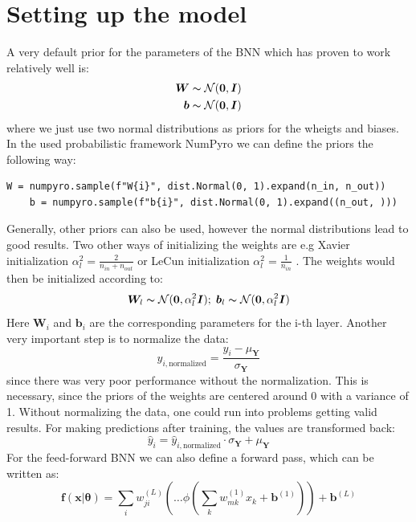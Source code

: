 \documentclass{article}
\newcommand{\Norm}{\mathcal{N}}
\begin{document}
\section{Setting up the model}
A very default prior for the parameters of the BNN which has proven to work relatively well \cite{BNNTut} is:
\begin{align}
    \bm W \thicksim \mathcal{N}(\bm 0,\bm I)\\
    \bm b \thicksim \mathcal{N}(\bm 0, \bm I)
\end{align}
where we just use two normal distributions as priors for the wheigts and biases. In the used probabilistic framework NumPyro we can define the priors the following way:
\begin{lstlisting}[caption= {Setting up priors for wheits},captionpos=t]
    W = numpyro.sample(f"W{i}", dist.Normal(0, 1).expand(n_in, n_out))
    b = numpyro.sample(f"b{i}", dist.Normal(0, 1).expand((n_out, )))
\end{lstlisting}
Generally, other priors can also be used, however the normal distributions lead to good results. Two  other ways of initializing the weights are e.g Xavier initialization $\alpha_l^2 = \tfrac{2}{n_{in}+n_{out}}$ or LeCun initialization $\alpha_l^2 = \tfrac{1}{n_{in}}$ \cite{murphy}. The weights would then be initialized according to:
\begin{equation}
    \bm W_l \thicksim \Norm(\bm 0, \alpha_l^2 \bm I); \; \bm b_l \thicksim \Norm(\bm 0, \alpha_l^2 \bm I)
\end{equation}
Here $\bm W_i$ and $\bm b_i$ are the corresponding parameters for the i-th layer. Another very important step is to normalize the data:
\begin{equation}
     y_{i, \text{normalized}} = \frac{ y_i - \mu_{\bm Y}}{\sigma_{\bm Y}}
\end{equation}
since there was very poor performance without the normalization. This is necessary, since the priors of the weights are centered around 0 with a variance of 1. Without normalizing the data, one could run into problems getting valid results. For making predictions after training, the values are transformed back:
\begin{equation}
    \hat{y}_i = \hat{y}_{i,\text{normalized}} \cdot {\sigma_{\bm Y}} + \mu_{\bm Y}
\end{equation}
For the feed-forward BNN we can also define a forward pass, which can be written as:
\begin{equation}
    \bm f(\bm x|\bm \theta) = \sum_i w^{(L)}_{ji} \left( \ldots \phi \left( \sum_k w^{(1)}_{mk}x_k + \bm b^{(1)} \right) \right) + \bm b^{(L)}
\end{equation}
\end{document}
